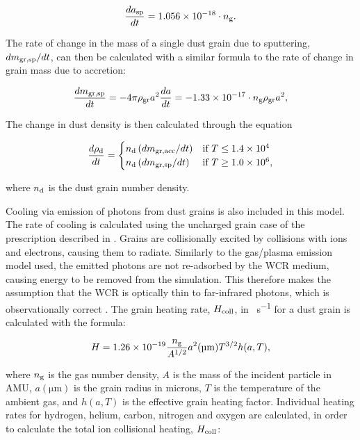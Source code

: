 \begin{equation}
  \frac{da_\text{sp}}{dt} = \num{1.056e-18} \cdot n_\text{g}. 
\end{equation}

\noindent
The rate of change in the mass of a single dust grain due to sputtering, $dm_\text{gr,sp}/dt$, can then be calculated with a similar formula to the rate of change in grain mass due to accretion:

\begin{equation}
  \frac{d m_\text{gr,sp}}{dt} = -4 \pi \rho_\text{gr} a^2 \frac{da}{dt} = \num{-1.33e-17} \cdot n_\text{g} \rho_\text{gr} a^2 ,
\end{equation}

\noindent
The change in dust density is then calculated through the equation

\begin{equation}
  \frac{d \rho_\text{d}}{dt} = 
  \begin{cases}
    n_\text{d} \left(dm_\text{gr,acc} / dt \right) & \text{if } T \leq \num{1.4e4} \\
    n_\text{d} \left(dm_\text{gr,sp} / dt \right)  & \text{if } T \geq \num{1.0e6} , 
  \end{cases}
\end{equation}

\noindent
where $n_\text{d}$ is the dust grain number density.

Cooling via emission of photons from dust grains is also included in this model.
The rate of cooling is calculated using the uncharged grain case of the prescription described in \textcite{dwek_infrared_1981}.
Grains are collisionally excited by collisions with ions and electrons, causing them to radiate.
Similarly to the gas/plasma emission model used, the emitted photons are not re-adsorbed by the WCR medium, causing energy to be removed from the simulation.
This therefore makes the assumption that the WCR is optically thin to far-infrared photons, which is observationally correct \parencite{monnierKeckAperturemaskingExperiment2007,soulainSPHEREViewWolfRayet2018,callinghamAnisotropicWindsWolf2019}.
The grain heating rate, $H_\text{coll}$, in \si{\erg\per\second} for a dust grain is calculated with the formula:

\begin{equation}
  \label{eq:p2-grainheat}
  H = 1.26 \times 10^{-19} \frac{n_\text{g}}{A^{1/2}} a^2(\si{\micro\metre}) T^{3/2} h(a,T) , 
\end{equation}

\noindent
where $n_\text{g}$ is the gas number density,
$A$ is the mass of the incident particle in AMU,
$a(\si{\micro\metre})$ is the grain radius in microns,
$T$ is the temperature of the ambient gas,
and $h(a,T)$ is the effective grain heating factor.
Individual heating rates for hydrogen, helium, carbon, nitrogen and oxygen are calculated, in order to calculate the total ion collisional heating, $H_\text{coll}$:

